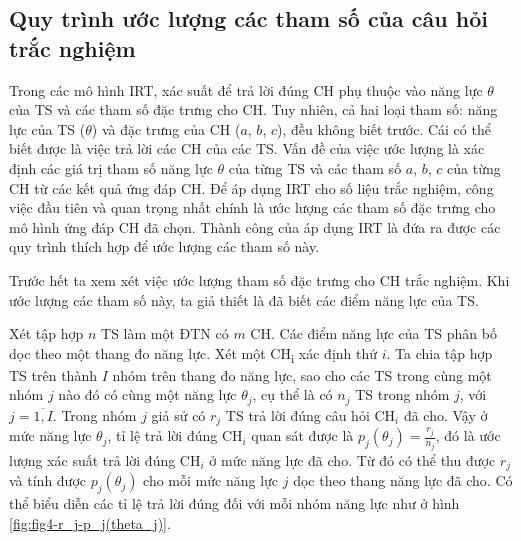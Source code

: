 \subsection{Quy trình ước lượng các tham số của câu hỏi trắc nghiệm}
Trong các mô hình IRT, xác suất để trả lời đúng CH phụ thuộc vào năng lực $\theta$ của TS và các tham số đặc trưng cho CH. Tuy nhiên, cả hai loại tham số: năng lực của TS ($\theta$) và đặc trưng của CH ($a$, $b$, $c$), đều không biết trước. Cái có thể biết được là việc trả lời các CH của các TS. Vấn đề của việc ước lượng là xác định các giá trị tham số năng lực $\theta$ của từng TS và các tham số $a$, $b$, $c$ của từng CH từ các kết quả ứng đáp CH. Để áp dụng IRT cho số liệu trắc nghiệm, công việc đầu tiên và quan trọng nhất chính là ước lượng các tham số đặc trưng cho mô hình ứng đáp CH đã chọn. Thành công của áp dụng IRT là đứa ra được các quy trình thích hợp để ước lượng các tham số này.\par
Trước hết ta xem xét việc ước lượng tham số đặc trưng cho CH trắc nghiệm. Khi ước lượng các tham số này, ta giả thiết là đã biết các điểm năng lực của TS.\par
Xét tập hợp $n$ TS làm một ĐTN có $m$ CH. Các điểm năng lực của TS phân bố dọc theo một thang đo năng lực. Xét một CH\textsubscript{i} xác định thứ $i$. Ta chia tập hợp TS trên thành $I$ nhóm trên thang đo năng lực, sao cho các TS trong cùng một nhóm $j$ nào đó có cùng một năng lực $\theta_j$, cụ thể là có $n_j$ TS trong nhóm $j$, với $j=\overline{1,I}$. Trong nhóm $j$ giả sử có $r_j$ TS trả lời đúng câu hỏi CH$_i$ đã cho. Vậy ở mức năng lực $\theta_j$, tỉ lệ trả lời đúng CH$_i$ quan sát được là $p_j(\theta_j)=\frac{r_j}{n_j}$, đó là ước lượng xác suất trả lời đúng CH$_i$ ở mức năng lực đã cho. Từ đó có thể thu được $r_j$ và tính được $p_j(\theta_j)$ cho mỗi mức năng lực $j$ dọc theo thang năng lực đã cho. Có thể biểu diễn các tỉ lệ trả lời đúng đối với mỗi nhóm năng lực như ở hình \ref{fig:fig4-r_j-p_j(theta_j)}.
